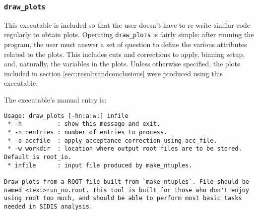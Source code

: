 \subsubsection{\texttt{draw\_plots}}
    This executable is included so that the user doesn't have to re-write similar code regularly to obtain plots.
    Operating \texttt{draw\_plots} is fairly simple: after running the program, the user must answer a set of question to define the various attributes related to the plots.
    This includes cuts and corrections to apply, binning setup, and, naturally, the variables in the plots.
    Unless otherwise specified, the plots included in section \ref{sec::resultsandconclusions} were produced using this executable.

    The executable's manual entry is:
    \begin{lstlisting}
Usage: draw_plots [-hn:a:w:] infile
 * -h          : show this message and exit.
 * -n nentries : number of entries to process.
 * -a accfile  : apply acceptance correction using acc_file.
 * -w workdir  : location where output root files are to be stored. Default is root_io.
 * infile      : input file produced by make_ntuples.

Draw plots from a ROOT file built from `make_ntuples`. File should be named <text>run_no.root. This tool is built for those who don't enjoy using root too much, and should be able to perform most basic tasks needed in SIDIS analysis.
    \end{lstlisting}
